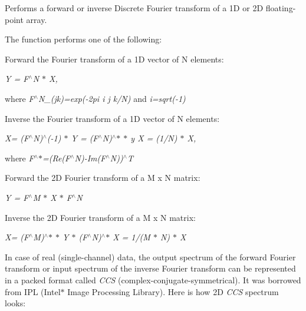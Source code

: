 Performs a forward or inverse Discrete Fourier transform of a 1D or 2D floating-\/point array.

The function performs one of the following\+:


\begin{DoxyItemize}
\item Forward the Fourier transform of a 1D vector of {\ttfamily N} elements\+: 
\end{DoxyItemize}

{\itshape Y = F$^\wedge$N $\ast$ X,}

where {\itshape F$^\wedge$\+N\+\_\+(jk)=exp(-\/2pi i j k/N)} and {\itshape i=sqrt(-\/1)}


\begin{DoxyItemize}
\item Inverse the Fourier transform of a 1D vector of {\ttfamily N} elements\+: 
\end{DoxyItemize}

{\itshape X\textquotesingle{}= (F$^\wedge$N)$^\wedge$(-\/1) $\ast$ Y = (F$^\wedge$N)$^\wedge$$\ast$ $\ast$ y X = (1/N) $\ast$ X, }

where {\itshape F$^\wedge$$\ast$=(Re(\+F$^\wedge$\+N)-\/\+Im(F$^\wedge$N))$^\wedge$T}


\begin{DoxyItemize}
\item Forward the 2D Fourier transform of a {\ttfamily M x N} matrix\+: 
\end{DoxyItemize}

{\itshape Y = F$^\wedge$M $\ast$ X $\ast$ F$^\wedge$N}


\begin{DoxyItemize}
\item Inverse the 2D Fourier transform of a {\ttfamily M x N} matrix\+: 
\end{DoxyItemize}

{\itshape X\textquotesingle{}= (F$^\wedge$M)$^\wedge$$\ast$ $\ast$ Y $\ast$ (F$^\wedge$N)$^\wedge$$\ast$ X = 1/(M $\ast$ N) $\ast$ X\textquotesingle{} }

In case of real (single-\/channel) data, the output spectrum of the forward Fourier transform or input spectrum of the inverse Fourier transform can be represented in a packed format called {\itshape C\+CS} (complex-\/conjugate-\/symmetrical). It was borrowed from I\+PL (Intel$\ast$ Image Processing Library). Here is how 2D {\itshape C\+CS} spectrum looks\+:


